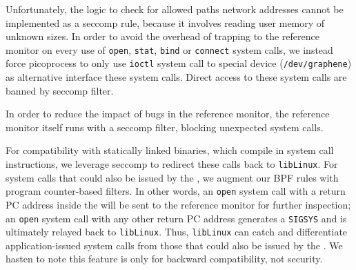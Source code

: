 
Unfortunately, the logic to check for allowed paths network addresses cannot be implemented 
as a seccomp rule, because it involves reading user memory of unknown sizes. 
In order to avoid the overhead of trapping to the reference monitor on 
every use of {\tt open}, {\tt stat}, {\tt bind} or {\tt connect} system calls, we instead 
force picoprocess to only use {\tt ioctl} system call to \sysname{} special device ({\tt /dev/graphene}) as alternative interface these system calls. Direct access to these system calls are banned by seccomp filter.

In order to reduce the impact of bugs in the reference monitor,
the reference monitor itself runs with a seccomp filter,
blocking unexpected system calls.

\vspace{5pt}
For compatibility with statically linked binaries, which 
compile in system call instructions,
we leverage seccomp to redirect these calls 
back to {\tt libLinux}.  
For system calls that could also be issued by the \pal{},
we augment our BPF rules with program counter-based filters.
In other words, an {\tt open} system call with a return PC address inside the \pal{} 
will be sent to the reference monitor for further inspection;
an {\tt open} system call with any other return PC address generates 
a {\tt SIGSYS} and is ultimately relayed back to {\tt libLinux}.
Thus, {\tt libLinux} can catch and differentiate application-issued system calls
from those that could also be issued by the \pal{}.
We hasten to note this feature is only for backward compatibility,
not security. 


\begin{comment}
We hasten to note that program counter filtering
is only provided for backwards compatibility, not security.
An attacker can compromise the \pal{}, so system policies are enforced
externally by the reference monitor.


Dynamically redirecting system calls to {\tt libLinux} is 
less efficient than dynamically linking against
the \sysname{} libc or statically compiling {\tt libLinux} into the application.
The overhead of dynamic redirection comes from 
transferring control to the kernel, then back to 
the \pal{}, and then to {\tt libLinux}.
We leave exploration of more efficient alternatives for future work,
such as redirecting the hardware system call table to {\tt libLinux}
on a host system like Dune~\citep{belay12dune},
or dynamically rewriting parts of the static binary~\citep{hunt99detours}.
\end{comment}

